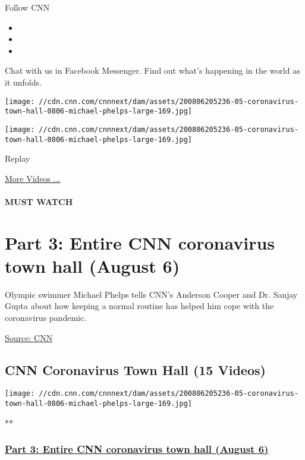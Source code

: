 Follow CNN

\begin{itemize}
\item
\item
\item
\end{itemize}

Chat with us in Facebook Messenger. Find out what's happening in the
world as it unfolds.

\texttt{[image: //cdn.cnn.com/cnnnext/dam/assets/200806205236-05-coronavirus-town-hall-0806-michael-phelps-large-169.jpg]}

\texttt{[image: //cdn.cnn.com/cnnnext/dam/assets/200806205236-05-coronavirus-town-hall-0806-michael-phelps-large-169.jpg]}\href{javascript:void(0);}{}

Replay

\href{/videos}{More Videos ...}

\hypertarget{must-watch}{%
\paragraph{MUST WATCH}\label{must-watch}}

\hypertarget{part-3-entire-cnn-coronavirus-town-hall-august-6}{%
\section{Part 3: Entire CNN coronavirus town hall (August
6)}\label{part-3-entire-cnn-coronavirus-town-hall-august-6}}

Olympic swimmer Michael Phelps tells CNN's Anderson Cooper and Dr.
Sanjay Gupta about how keeping a normal routine has helped him cope with
the coronavirus pandemic.

\href{https://www.cnn.com/}{Source: CNN}

\hypertarget{cnn-coronavirus-town-hall-15-videos}{%
\subsection{CNN Coronavirus Town Hall (15
Videos)}\label{cnn-coronavirus-town-hall-15-videos}}

\href{/videos/health/2020/08/06/entire-august-6-coronavirus-town-hall-part-3-sot-vpx.cnn}{}

\texttt{[image: //cdn.cnn.com/cnnnext/dam/assets/200806205236-05-coronavirus-town-hall-0806-michael-phelps-large-169.jpg]}

**

\hypertarget{part-3-entire-cnn-coronavirus-town-hall-august-6-1}{%
\subsubsection{\texorpdfstring{\href{/videos/health/2020/08/06/entire-august-6-coronavirus-town-hall-part-3-sot-vpx.cnn}{Part
3: Entire CNN coronavirus town hall (August
6)}}{Part 3: Entire CNN coronavirus town hall (August 6)}}\label{part-3-entire-cnn-coronavirus-town-hall-august-6-1}}

